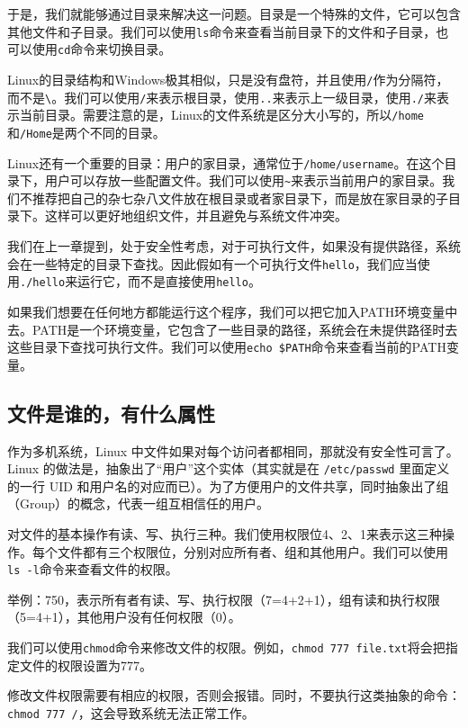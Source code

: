 \documentclass[../main.tex]{subfiles}
\begin{document}
于是，我们就能够通过目录来解决这一问题。目录是一个特殊的文件，它可以包含其他文件和子目录。我们可以使用\texttt{ls}命令来查看当前目录下的文件和子目录，也可以使用\texttt{cd}命令来切换目录。

Linux的目录结构和Windows极其相似，只是没有盘符，并且使用\texttt{/}作为分隔符，而不是\texttt{\textbackslash}。我们可以使用\texttt{/}来表示根目录，使用\texttt{..}来表示上一级目录，使用\texttt{./}来表示当前目录。需要注意的是，Linux的文件系统是区分大小写的，所以\texttt{/home}和\texttt{/Home}是两个不同的目录。

Linux还有一个重要的目录：用户的家目录，通常位于\texttt{/home/username}。在这个目录下，用户可以存放一些配置文件。我们可以使用\texttt{\textasciitilde}来表示当前用户的家目录。我们不推荐把自己的杂七杂八文件放在根目录或者家目录下，而是放在家目录的子目录下。这样可以更好地组织文件，并且避免与系统文件冲突。

我们在上一章提到，处于安全性考虑，对于可执行文件，如果没有提供路径，系统会在一些特定的目录下查找。因此假如有一个可执行文件\texttt{hello}，我们应当使用\texttt{./hello}来运行它，而不是直接使用\texttt{hello}。

如果我们想要在任何地方都能运行这个程序，我们可以把它加入PATH环境变量中去。PATH是一个环境变量，它包含了一些目录的路径，系统会在未提供路径时去这些目录下查找可执行文件。我们可以使用\texttt{echo \$PATH}命令来查看当前的PATH变量。

\subsection{文件是谁的，有什么属性}

作为多机系统，Linux 中文件如果对每个访问者都相同，那就没有安全性可言了。Linux 的做法是，抽象出了“用户”这个实体（其实就是在 \texttt{/etc/passwd} 里面定义的一行 UID 和用户名的对应而已）。为了方便用户的文件共享，同时抽象出了组（Group）的概念，代表一组互相信任的用户。

对文件的基本操作有读、写、执行三种。我们使用权限位4、2、1来表示这三种操作。每个文件都有三个权限位，分别对应所有者、组和其他用户。我们可以使用\texttt{ls -l}命令来查看文件的权限。

举例：750，表示所有者有读、写、执行权限（7=4+2+1），组有读和执行权限（5=4+1），其他用户没有任何权限（0）。

我们可以使用\texttt{chmod}命令来修改文件的权限。例如，\texttt{chmod 777 file.txt}将会把指定文件的权限设置为777。

\begin{tcolorbox}[title=注意]
  修改文件权限需要有相应的权限，否则会报错。同时，不要执行这类抽象的命令：\texttt{chmod 777 /}，这会导致系统无法正常工作。
\end{tcolorbox}
\end{document}
